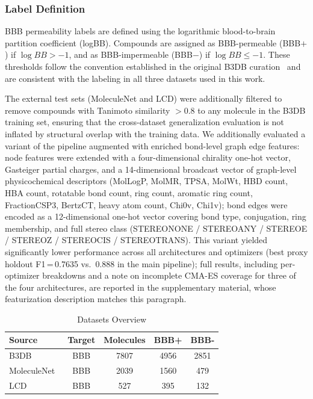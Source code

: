 \documentclass[conference]{IEEEtran}
\begin{document}
\subsubsection{Label Definition}
BBB permeability labels are defined using the logarithmic blood-to-brain
partition coefficient (logBB). Compounds are assigned as BBB-permeable
(BBB$+$) if $\log BB > -1$, and as BBB-impermeable (BBB$-$) if
$\log BB \leq -1$. These thresholds follow the convention established
in the original B3DB curation~\cite{Meng_A_curated_diverse_2021} and
are consistent with the labeling in all three datasets used in this
work.

The external test sets (MoleculeNet and LCD) were additionally
filtered to remove compounds with Tanimoto similarity $> 0.8$ to any
molecule in the B3DB training set, ensuring that the cross-dataset
generalization evaluation is not inflated by structural overlap with
the training data.
We additionally evaluated a variant of the pipeline augmented with
enriched bond-level graph edge features: node features were extended
with a four-dimensional chirality one-hot vector, Gasteiger partial
charges, and a 14-dimensional broadcast vector of graph-level
physicochemical descriptors (MolLogP, MolMR, TPSA, MolWt, HBD
count, HBA count, rotatable bond count, ring count, aromatic ring count,
FractionCSP3, BertzCT, heavy atom count, Chi0v, Chi1v); bond edges were encoded as a
12-dimensional one-hot vector covering bond type, conjugation, ring
membership, and full stereo class (STEREONONE / STEREOANY / STEREOE /
STEREOZ / STEREOCIS / STEREOTRANS). This variant yielded significantly lower performance across all
architectures and optimizers (best proxy holdout F1\,=\,0.7635 vs.\ 0.888 in
the main pipeline); full results, including per-optimizer breakdowns
and a note on incomplete CMA-ES coverage for three of the four
architectures, are reported in the supplementary material, whose
featurization description matches this paragraph.

\begin{table}[htbp]
\centering
\caption{Datasets Overview}
\label{tab:datasets_overview}
\begin{tabular}{lcccc}
\hline
\textbf{Source} & \textbf{Target} & \textbf{Molecules} & \textbf{BBB+} & \textbf{BBB-} \\
\hline
B3DB~\cite{Meng_A_curated_diverse_2021} & BBB & 7807 & 4956 & 2851 \\
MoleculeNet~\cite{wu2018moleculenet}     & BBB & 2039 & 1560 &  479 \\
LCD~\cite{Tong2022}                  & BBB &  527 &  395 &  132 \\
\hline
\end{tabular}
\end{table}
\end{document}
